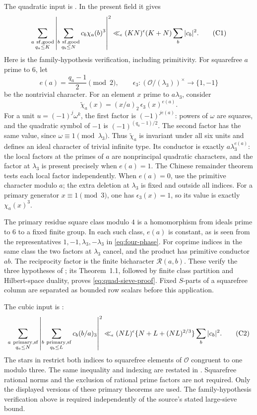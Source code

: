 \documentclass[12pt]{article}
\begin{document}
The quadratic input is \cite[Definition 1 and Theorem 1.1]{GL}.
In the present field it gives
\[
 \sum_{\substack{a\ {\rm sf,good}\\q_a\le K}}
   \left|\sum_{\substack{b\ {\rm sf,good}\\q_b\le N}}
                    c_b\chi_a(b)^3\right|^2
 \ll_\epsilon(KN)^\epsilon(K+N)\sum_b|c_b|^2 .
 \tag{C1}\label{eq:quad-sieve-proof}
\]
Here is the family-hypothesis verification, including primitivity.
For squarefree \(a\) prime to \(6\), let
\[
 e(a)=\frac{q_a-1}{2}\pmod2,\qquad
 \epsilon_3:(\mathcal O/(\lambda_3))^\times\longrightarrow\{1,-1\}
\]
be the nontrivial character.  For an element \(x\) prime to
\(a\lambda_3\), consider
\[
 \widetilde\chi_a(x)=(x/a)_2\,\epsilon_3(x)^{e(a)} .
\]
For a unit \(u=(-1)^j\omega^k\), the first factor is
\((-1)^{j e(a)}\): powers of \(\omega\) are squares, and the
quadratic symbol of \(-1\) is \((-1)^{(q_a-1)/2}\).
The second factor has the same value, since \(\omega\equiv1
\pmod{\lambda_3}\).  Thus \(\widetilde\chi_a\) is invariant under
all six units and defines an ideal character of trivial infinite type.
Its conductor is exactly \(a\lambda_3^{e(a)}\): the local factors at
the primes of \(a\) are nonprincipal quadratic characters, and the
factor at \(\lambda_3\) is present precisely when \(e(a)=1\).
The Chinese remainder theorem tests each local factor independently.
When \(e(a)=0\), use the primitive character modulo \(a\);
the extra deletion at \(\lambda_3\) is fixed and outside all indices.
For a primary generator \(x\equiv1\pmod3\), one has
\(\epsilon_3(x)=1\), so its value is exactly \(\chi_a(x)^3\).

The primary residue square class modulo \(4\) is a homomorphism
from ideals prime to \(6\) to a fixed finite group.  In each such
class, \(e(a)\) is constant, as is seen from the representatives
\(1,-1,\lambda_3,-\lambda_3\) in \eqref{eq:four-phase}.
For coprime indices in the same class the two factors at
\(\lambda_3\) cancel, and the product has primitive conductor \(ab\).
The reciprocity factor is the finite bicharacter
\(\mathcal R(a,b)\).  These verify the three hypotheses of
\cite[Definition 1]{GL}; its Theorem~1.1, followed by finite class
partition and Hilbert-space duality, proves
\eqref{eq:quad-sieve-proof}.
Fixed \(S\)-parts of a squarefree column are separated as bounded
row scalars before this application.

The cubic input is \cite[Theorem 2]{HB}:
\[
 \sum_{\substack{a\ {\rm primary,sf}\\q_a\le N}}
  \left|\sum_{\substack{b\ {\rm primary,sf}\\q_b\le L}}
                      c_b(b/a)_3\right|^2
 \ll_\epsilon(NL)^\epsilon
       \{N+L+(NL)^{2/3}\}\sum_b|c_b|^2 .
 \tag{C2}\label{eq:cubic-sieve-proof}
\]
The stars in \cite[Theorem 2, pp.\ 3--4]{HB} restrict both
indices to squarefree elements of \(\mathcal O\) congruent to one
modulo three.  The same inequality and indexing are restated in
\cite[Theorem 9.1]{DR}.  Squarefree rational norms and the exclusion
of rational prime factors are not required.
Only the displayed versions of these primary theorems are used.
The family-hypothesis verification above is required independently
of the source's stated large-sieve bound.
\end{document}

